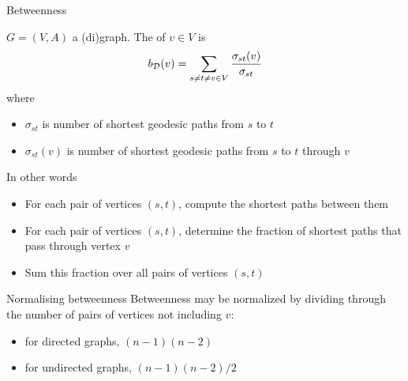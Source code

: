 \documentclass[aspectratio=43]{beamer}
\begin{document}
\begin{frame}{Betweenness}
\begin{definition}[Betweenness]
	$G=(V,A)$ a (di)graph. The  of $v\in V$ is
	\[
	b_{\mathcal{D}}(v)= \sum_{s\neq t\neq v  \in V} \frac{\sigma_{st}(v)}{\sigma_{st}}
	\]
	where
	\begin{itemize}
	\item $\sigma_{st}$ is number of shortest geodesic paths from $s$ to $t$
	\item $\sigma_{st}(v)$ is number of shortest geodesic paths from $s$ to $t$ through $v$
	\end{itemize}		
\end{definition}
\end{frame}

\begin{frame}
In other words
\begin{itemize}
	\item For each pair of vertices $(s,t)$, compute the shortest paths between them
	\item For each pair of vertices $(s,t)$, determine the fraction of shortest paths that pass through vertex $v$
	\item Sum this fraction over all pairs of vertices $(s,t)$
\end{itemize}
\end{frame}

\begin{frame}{Normalising betweenness}
	Betweenness may be normalized by dividing through the number of pairs of vertices not including $v$:
	\begin{itemize}
		\item for directed graphs, $(n-1)(n-2)$
		\item for undirected graphs, $(n-1)(n-2)/2$
	\end{itemize}
\end{frame}
\end{document}
